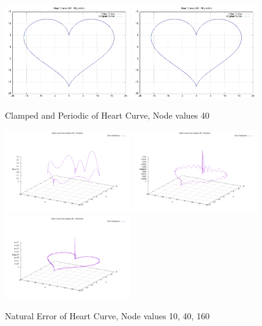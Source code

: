 \documentclass{article}
\begin{document}
\begin{figure}[H]
    \centering
    \includegraphics[width=0.48\textwidth]{../figure/B2heartspline_plot_40.png}
    \includegraphics[width=0.48\textwidth]{../figure/B3heartspline_plot_40.png}
    \caption{Clamped and Periodic of Heart Curve, Node values 40}
\end{figure}

\begin{figure}[H]
    \centering
    \includegraphics[width=0.48\textwidth]{../figure/B1heartspline_error3d_10.png}
    \includegraphics[width=0.48\textwidth]{../figure/B1heartspline_error3d_40.png}
    \includegraphics[width=0.48\textwidth]{../figure/B1heartspline_error3d_160.png}
    \caption{Natural Error of Heart Curve, Node values 10, 40, 160}
\end{figure}
\end{document}
